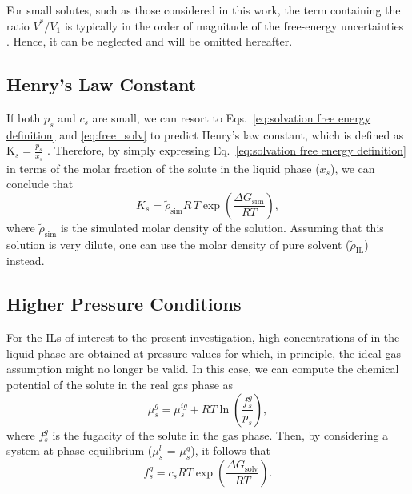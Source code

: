 \documentclass[3p,twocolumn]{elsarticle}
\begin{document}
For small solutes, such as those considered in this work, the term containing the ratio $V^{\ast}/V_1$ is typically in the order of magnitude of the free-energy uncertainties \cite{Shirts_2003}.
Hence, it can be neglected and will be omitted hereafter.

\subsection*{Henry's Law Constant}

If both $p_s$ and $c_s$ are small, we can resort to Eqs.~\eqref{eq:solvation free energy definition} and \eqref{eq:free_solv} to predict Henry's law constant, which is defined as $\text{K}_s =\frac{p_s}{x_s}$ \cite{Prausnitz}.
%
Therefore, by simply expressing Eq.~\eqref{eq:solvation free energy definition} in terms of the molar fraction of the solute in the liquid phase ($x_s$), we can conclude that
\begin{equation}
\label{eq:henry_eq}
K_s = \tilde{\rho}_\text{sim} R \, T \exp\left(\frac{\Delta G_\text{sim}}{R T}\right),
\end{equation}
where $\tilde{\rho}_\text{sim}$ is the simulated molar density of the solution. Assuming that this solution is very dilute, one can use the molar density of pure solvent ($\tilde{\rho}_\text{IL}$) instead.

\subsection*{Higher Pressure Conditions}
\label{sec:partial_pressure}

For the ILs of interest to the present investigation, high concentrations of  in the liquid phase are obtained at pressure values for which, in principle, the ideal gas assumption might no longer be valid.
In this case, we can compute the chemical potential of the solute in the real gas phase as
\begin{equation}
\label{eq:mu_gas_real}
\mu^{g}_s = \mu^{ig}_s + R T \ln \left(\frac{f^{g}_s}{p_s}\right),
\end{equation}
where $f^{g}_s$ is the fugacity of the solute in the gas phase.
Then, by considering a system at phase equilibrium ($\mu^{l}_s$ = $\mu^{g}_s$), it follows that
\begin{equation}
\label{eq:fgas_d}
f^{g}_s = c_s R T \exp \left( \frac{\Delta G_\text{solv}}{R T} \right). 
\end{equation}
\end{document}

